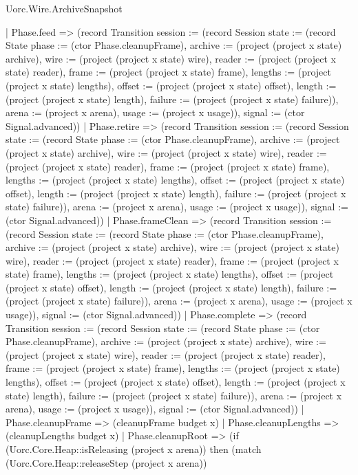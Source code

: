 \begin{lexlean}{Uorc.Wire.ArchiveSnapshot}
\begin{semanticmodule}
{    | Phase.feed => (record Transition {session := (record Session {state := (record State {phase := (ctor Phase.cleanupFrame), archive := (project (project x state) archive), wire := (project (project x state) wire), reader := (project (project x state) reader), frame := (project (project x state) frame), lengths := (project (project x state) lengths), offset := (project (project x state) offset), length := (project (project x state) length), failure := (project (project x state) failure)}), arena := (project x arena), usage := (project x usage)}), signal := (ctor Signal.advanced)})
    | Phase.retire => (record Transition {session := (record Session {state := (record State {phase := (ctor Phase.cleanupFrame), archive := (project (project x state) archive), wire := (project (project x state) wire), reader := (project (project x state) reader), frame := (project (project x state) frame), lengths := (project (project x state) lengths), offset := (project (project x state) offset), length := (project (project x state) length), failure := (project (project x state) failure)}), arena := (project x arena), usage := (project x usage)}), signal := (ctor Signal.advanced)})
    | Phase.frameClean => (record Transition {session := (record Session {state := (record State {phase := (ctor Phase.cleanupFrame), archive := (project (project x state) archive), wire := (project (project x state) wire), reader := (project (project x state) reader), frame := (project (project x state) frame), lengths := (project (project x state) lengths), offset := (project (project x state) offset), length := (project (project x state) length), failure := (project (project x state) failure)}), arena := (project x arena), usage := (project x usage)}), signal := (ctor Signal.advanced)})
    | Phase.complete => (record Transition {session := (record Session {state := (record State {phase := (ctor Phase.cleanupFrame), archive := (project (project x state) archive), wire := (project (project x state) wire), reader := (project (project x state) reader), frame := (project (project x state) frame), lengths := (project (project x state) lengths), offset := (project (project x state) offset), length := (project (project x state) length), failure := (project (project x state) failure)}), arena := (project x arena), usage := (project x usage)}), signal := (ctor Signal.advanced)})
    | Phase.cleanupFrame => (cleanupFrame budget x)
    | Phase.cleanupLengths => (cleanupLengths budget x)
    | Phase.cleanupRoot => (if (Uorc.Core.Heap::isReleasing (project x arena)) then (match (Uorc.Core.Heap::releaseStep (project x arena))
}
\end{semanticmodule}
\end{lexlean}
